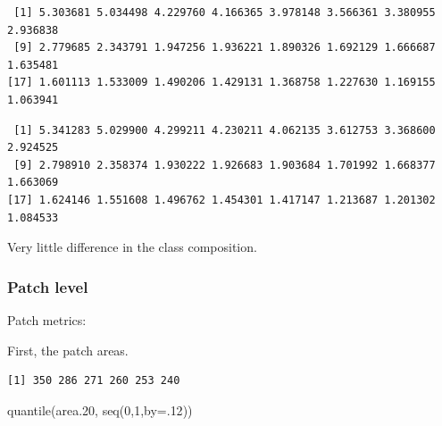 \documentclass[
  letterpaper,
  DIV=11,
  numbers=noendperiod]{scrartcl}
\newenvironment{Shaded}{\begin{snugshade}}{\end{snugshade}}
\newcommand{\AttributeTok}[1]{\textcolor[rgb]{0.40,0.45,0.13}{#1}}
\newcommand{\CommentTok}[1]{\textcolor[rgb]{0.37,0.37,0.37}{#1}}
\newcommand{\ConstantTok}[1]{\textcolor[rgb]{0.56,0.35,0.01}{#1}}
\newcommand{\DecValTok}[1]{\textcolor[rgb]{0.68,0.00,0.00}{#1}}
\newcommand{\FloatTok}[1]{\textcolor[rgb]{0.68,0.00,0.00}{#1}}
\newcommand{\FunctionTok}[1]{\textcolor[rgb]{0.28,0.35,0.67}{#1}}
\newcommand{\NormalTok}[1]{\textcolor[rgb]{0.00,0.23,0.31}{#1}}
\newcommand{\OtherTok}[1]{\textcolor[rgb]{0.00,0.23,0.31}{#1}}
\newcommand{\SpecialCharTok}[1]{\textcolor[rgb]{0.37,0.37,0.37}{#1}}
\newcommand{\StringTok}[1]{\textcolor[rgb]{0.13,0.47,0.30}{#1}}
\begin{document}
\begin{verbatim}
 [1] 5.303681 5.034498 4.229760 4.166365 3.978148 3.566361 3.380955 2.936838
 [9] 2.779685 2.343791 1.947256 1.936221 1.890326 1.692129 1.666687 1.635481
[17] 1.601113 1.533009 1.490206 1.429131 1.368758 1.227630 1.169155 1.063941
\end{verbatim}

\begin{Shaded}
\end{Shaded}

\begin{verbatim}
 [1] 5.341283 5.029900 4.299211 4.230211 4.062135 3.612753 3.368600 2.924525
 [9] 2.798910 2.358374 1.930222 1.926683 1.903684 1.701992 1.668377 1.663069
[17] 1.624146 1.551608 1.496762 1.454301 1.417147 1.213687 1.201302 1.084533
\end{verbatim}

Very little difference in the class composition.

\hypertarget{patch-level-1}{%
\subsubsection{Patch level}\label{patch-level-1}}

Patch metrics:

First, the patch areas.

\begin{Shaded}
\end{Shaded}

\begin{verbatim}
[1] 350 286 271 260 253 240
\end{verbatim}

\begin{Shaded}
\begin{Highlighting}[]
\FunctionTok{quantile}\NormalTok{(area}\FloatTok{.20}\NormalTok{, }\FunctionTok{seq}\NormalTok{(}\DecValTok{0}\NormalTok{,}\DecValTok{1}\NormalTok{,}\AttributeTok{by=}\NormalTok{.}\DecValTok{12}\NormalTok{))}
\end{Highlighting}
\end{Shaded}
\end{document}
